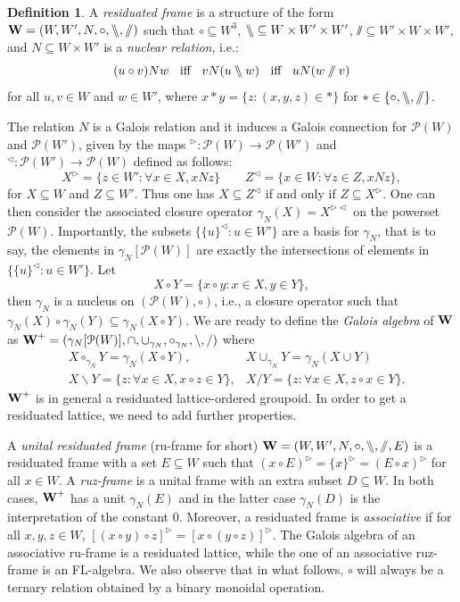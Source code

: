 \documentclass{amsart}
\theoremstyle{definition}
\newtheorem{definition}[theorem]{Definition}
\numberwithin{equation}{section}
\newcommand{\alg}[1]{{\textbf{\upshape #1}}}  %
\newcommand{\leftr}{\bbslash}
\newcommand{\rightr}{\sslash}
\begin{document}
 \begin{definition}
 	A {\em residuated frame} is a structure of the form $\alg W =(W,W',N, \circ, \leftr, \rightr)$ such that $\circ \subseteq W^3$, $\leftr \subseteq W \times W' \times W'$, $\rightr \subseteq W' \times W \times W'$, and  $N\subseteq W \times W'$ is a {\em nuclear relation}, i.e.:
 		$$(u \circ v)N w \;\;\mbox{ iff }\;\; v N (u \leftr w) \;\;\mbox{ iff }\;\; u N (w \rightr v)$$
 		for all $u,v \in W$ and $w \in W'$, where $x * y= \{z : (x,y,z) \in *\}$ for $* \in \{\circ, \leftr,\rightr\}$.
 \end{definition}
 The relation $N$ is a Galois relation and it induces a Galois connection for $\mathcal{P}(W)$ and $\mathcal{P}(W')$, given by the maps $^{\triangleright}: \mathcal{P}(W) \to \mathcal{P}(W')$ and $^{\triangleleft}: \mathcal{P}(W') \to \mathcal{P}(W)$ defined as follows:
 $$
 X^{\triangleright}= \{ z \in W' : \forall x \in X, x N z \} \qquad Z^{\triangleleft}=\{ x \in W : \forall z \in Z, x N z\},
 $$for $X \subseteq W$ and $Z \subseteq W'$. Thus one has  $X \subseteq Z^\triangleleft$ if and only if $Z \subseteq X^\triangleright$. One can then consider the associated closure operator $\gamma_N(X)=X^{\triangleright \triangleleft}$ on the powerset $\mathcal{P}(W)$. Importantly, the subsets $\{\{u\}^\triangleleft : u \in W'\}$ are a basis for $\gamma_N$, that is to say, the elements in $\gamma_N[\mathcal{P}(W)]$ are exactly the intersections of elements in $\{\{u\}^\triangleleft : u \in W'\}$. Let 
 $$
 X \circ Y = \{x \circ y : x \in X, y \in Y\},
 $$
 then $\gamma_N$ is a nucleus on $(\mathcal{P}(W), \circ)$, i.e., a closure operator such that $\gamma_N(X)\circ \gamma_N(Y)\subseteq \gamma_N (X \circ Y)$. We are ready to define the {\em Galois algebra} of $\alg W$ as $\alg W^+=(\gamma_N[\mathcal{P}(W)], \cap, \cup_{\gamma_N}, \circ_{\gamma_N}, \backslash, /)$ where 
\begin{eqnarray*}
	& X\circ_{\gamma_N} Y = \gamma_N(X \circ Y), &X \cup_{\gamma_N} Y = \gamma_N(X \cup Y)\\
&  X \backslash Y = \{ z : \forall x \in X, x \circ z \in Y\}, &X / Y =\{ z :\forall x \in X, z \circ x \in Y \}.
\end{eqnarray*}
$\alg W^+$ is in general a residuated lattice-ordered groupoid. In order to get a residuated lattice, we need to add further properties.

A {\em unital residuated frame} (ru-frame for short) $\alg W=(W, W', N, \circ, \leftr, \rightr, E)$ is a residuated frame with a set $E \subseteq W$ such that $(x \circ E)^\triangleright= \{ x \}^\triangleright=(E \circ x)^\triangleright$ for all $x \in W$. A {\em ruz-frame} is a unital frame with an extra subset $D\subseteq W$. In both cases, $\alg W^+$ has a unit $\gamma_N(E)$ and in the latter case $\gamma_N(D)$ is the interpretation of the constant $0$. Moreover, a residuated frame is {\em associative} if for all $x,y,z \in W$, $[(x \circ y)\circ z]^\triangleright=[x \circ (y \circ z)]^\triangleright$. The Galois algebra of an associative ru-frame is a residuated lattice, while the one of an associative ruz-frame is an FL-algebra. We also observe that in what follows, $\circ$ will always be a ternary relation obtained by a binary monoidal operation. 
\end{document}
